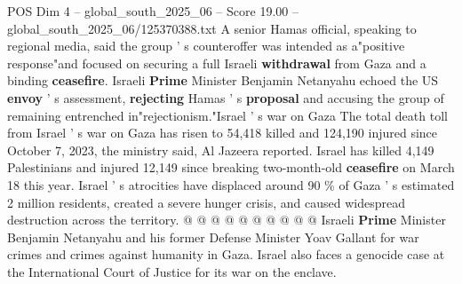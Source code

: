 \begin{textsample}{POS Dim 4 – global\_south\_2025\_06 – Score 19.00 – global\_south\_2025\_06/125370388.txt}
A senior Hamas official, speaking to regional media, said the group ' s counteroffer was intended as a"positive response"and focused on securing a full Israeli \textbf{withdrawal} from Gaza and a binding \textbf{ceasefire}.
Israeli \textbf{Prime} Minister Benjamin Netanyahu echoed the US \textbf{envoy} ' s assessment, \textbf{rejecting} Hamas ' s \textbf{proposal} and accusing the group of remaining entrenched in"rejectionism."Israel ' s war on Gaza The total death toll from Israel ' s war on Gaza has risen to 54,418 killed and 124,190 injured since October 7, 2023, the ministry said, Al Jazeera reported.
Israel has killed 4,149 Palestinians and injured 12,149 since breaking two-month-old \textbf{ceasefire} on March 18 this year.
Israel ' s atrocities have displaced around 90 \% of Gaza ' s estimated 2 million residents, created a severe hunger crisis, and caused widespread destruction across the territory. @ @ @ @ @ @ @ @ @ @ Israeli \textbf{Prime} Minister Benjamin Netanyahu and his former Defense Minister Yoav Gallant for war crimes and crimes against humanity in Gaza.
Israel also faces a genocide case at the International Court of Justice for its war on the enclave.

\end{textsample}
